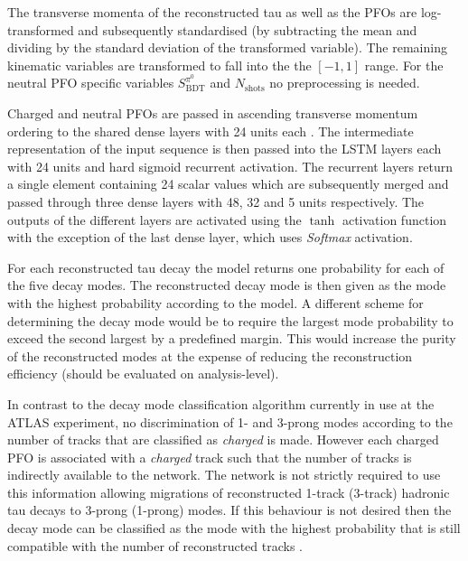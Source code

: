  The transverse momenta of the reconstructed tau as
well as the PFOs are log-transformed and subsequently standardised (by
subtracting the mean and dividing by the standard deviation of the transformed
variable). The remaining kinematic variables are transformed to fall into the
the $[-1, 1]$ range. For the neutral PFO specific variables
$S_\text{BDT}^{\pi^0}$ and $N_\text{shots}$ no preprocessing is needed.

Charged and neutral PFOs are passed in ascending transverse momentum ordering to
the shared dense layers with 24 units each . The
intermediate representation of the input sequence is then passed into the LSTM
layers each with 24 units and hard sigmoid recurrent activation. The recurrent
layers return a single element containing 24 scalar values which are
subsequently merged and passed through three dense layers with 48, 32 and 5
units respectively. The outputs of the different layers are activated using the
$\tanh$ activation function with the exception of the last dense layer, which
uses \emph{Softmax} activation.

For each reconstructed tau decay the model returns one probability for each of
the five decay modes. The reconstructed decay mode is then given as the mode
with the highest probability according to the model. A different scheme for
determining the decay mode would be to require the largest mode probability to
exceed the second largest by a predefined margin. This would increase the purity
of the reconstructed modes at the expense of reducing the reconstruction
efficiency (should be evaluated on analysis-level).

In contrast to the decay mode classification algorithm currently in use at the
ATLAS experiment, no discrimination of 1- and 3-prong modes according to the
number of tracks that are classified as \emph{charged} is made. However each
charged PFO is associated with a \emph{charged} track such that the number of
tracks is indirectly available to the network. The network is not strictly
required to use this information allowing migrations of reconstructed 1-track
(3-track) hadronic tau decays to 3-prong (1-prong) modes. If this behaviour is
not desired then the decay mode can be classified as the mode with the highest
probability that is still compatible with the number of reconstructed tracks
.

